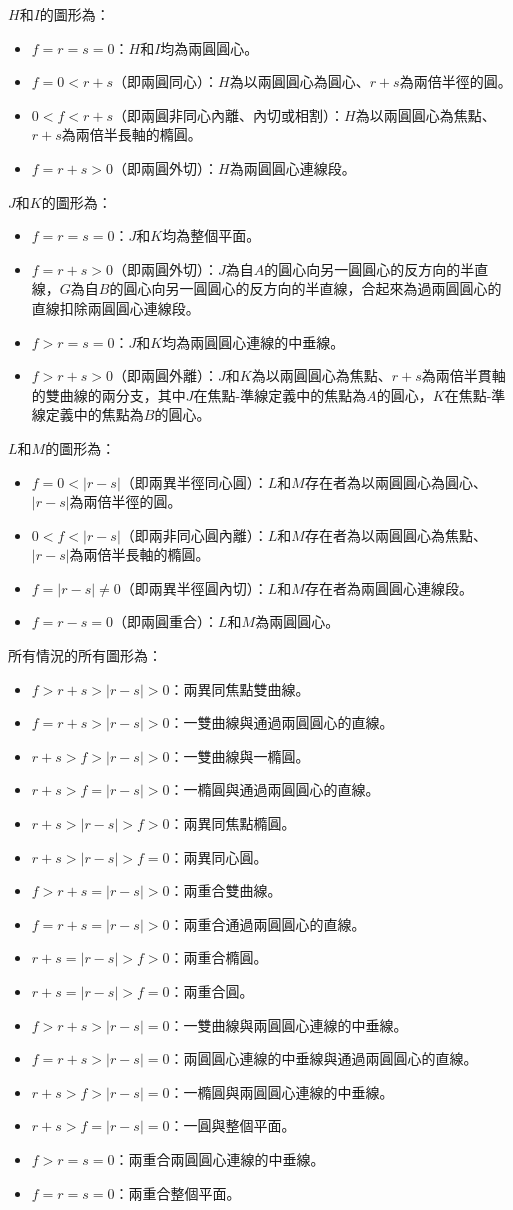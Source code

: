 \documentclass[a4paper,12pt]{article}
\begin{document}
$H$和$I$的圖形為：
\begin{itemize}
\item $f=r=s=0$：$H$和$I$均為兩圓圓心。
\item $f=0<r+s$（即兩圓同心）：$H$為以兩圓圓心為圓心、$r+s$為兩倍半徑的圓。
\item $0<f<r+s$（即兩圓非同心內離、內切或相割）：$H$為以兩圓圓心為焦點、$r+s$為兩倍半長軸的橢圓。
\item $f=r+s>0$（即兩圓外切）：$H$為兩圓圓心連線段。
\end{itemize}
$J$和$K$的圖形為：
\begin{itemize}
\item $f=r=s=0$：$J$和$K$均為整個平面。
\item $f=r+s>0$（即兩圓外切）：$J$為自$A$的圓心向另一圓圓心的反方向的半直線，$G$為自$B$的圓心向另一圓圓心的反方向的半直線，合起來為過兩圓圓心的直線扣除兩圓圓心連線段。
\item $f>r=s=0$：$J$和$K$均為兩圓圓心連線的中垂線。
\item $f>r+s>0$（即兩圓外離）：$J$和$K$為以兩圓圓心為焦點、$r+s$為兩倍半貫軸的雙曲線的兩分支，其中$J$在焦點-準線定義中的焦點為$A$的圓心，$K$在焦點-準線定義中的焦點為$B$的圓心。
\end{itemize}
$L$和$M$的圖形為：
\begin{itemize}
\item $f=0<|r-s|$（即兩異半徑同心圓）：$L$和$M$存在者為以兩圓圓心為圓心、$|r-s|$為兩倍半徑的圓。
\item $0<f<|r-s|$（即兩非同心圓內離）：$L$和$M$存在者為以兩圓圓心為焦點、$|r-s|$為兩倍半長軸的橢圓。
\item $f=|r-s|\neq 0$（即兩異半徑圓內切）：$L$和$M$存在者為兩圓圓心連線段。
\item $f=r-s=0$（即兩圓重合）：$L$和$M$為兩圓圓心。
\end{itemize}
所有情況的所有圖形為：
\begin{itemize}
\item $f>r+s>|r-s|>0$：兩異同焦點雙曲線。
\item $f=r+s>|r-s|>0$：一雙曲線與通過兩圓圓心的直線。
\item $r+s>f>|r-s|>0$：一雙曲線與一橢圓。
\item $r+s>f=|r-s|>0$：一橢圓與通過兩圓圓心的直線。
\item $r+s>|r-s|>f>0$：兩異同焦點橢圓。
\item $r+s>|r-s|>f=0$：兩異同心圓。
\item $f>r+s=|r-s|>0$：兩重合雙曲線。
\item $f=r+s=|r-s|>0$：兩重合通過兩圓圓心的直線。
\item $r+s=|r-s|>f>0$：兩重合橢圓。
\item $r+s=|r-s|>f=0$：兩重合圓。
\item $f>r+s>|r-s|=0$：一雙曲線與兩圓圓心連線的中垂線。
\item $f=r+s>|r-s|=0$：兩圓圓心連線的中垂線與通過兩圓圓心的直線。
\item $r+s>f>|r-s|=0$：一橢圓與兩圓圓心連線的中垂線。
\item $r+s>f=|r-s|=0$：一圓與整個平面。
\item $f>r=s=0$：兩重合兩圓圓心連線的中垂線。
\item $f=r=s=0$：兩重合整個平面。
\end{itemize}
\end{document}
